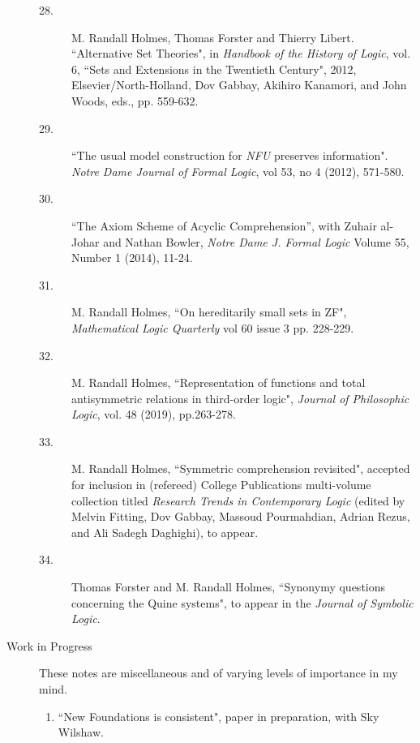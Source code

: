 \begin{description}
\begin{description}
\item[28.]
M. Randall Holmes, Thomas Forster and Thierry Libert. ``Alternative Set Theories",  in {\em Handbook of the History of Logic\/}, vol. 6, ``Sets and Extensions in the Twentieth Century", 2012, Elsevier/North-Holland, Dov Gabbay, Akihiro Kanamori, and John Woods, eds., pp. 559-632.

\item[29.] ``The usual model construction for {\em NFU\/} preserves information".  {\em Notre Dame Journal of Formal Logic\/}, vol 53, no 4 (2012), 571-580.

\item[30.]  ``The Axiom Scheme of Acyclic Comprehension'', with Zuhair al-Johar and Nathan Bowler, {\em Notre Dame J. Formal Logic\/}
Volume 55, Number 1 (2014), 11-24.

\item[31.]  M. Randall Holmes, ``On hereditarily small sets in ZF", {\em Mathematical Logic Quarterly\/}  vol 60 issue 3 pp. 228-229.

\item[32.]  M. Randall Holmes, ``Representation of functions and total antisymmetric relations in third-order logic", {\em Journal of Philosophic Logic\/}, vol. 48 (2019), pp.263-278.

\item[33.] M. Randall Holmes, ``Symmetric comprehension revisited", accepted for inclusion in (refereed) College Publications multi-volume collection titled {\em Research Trends in Contemporary Logic\/} (edited by Melvin Fitting, Dov Gabbay, Massoud Pourmahdian, Adrian Rezus, and Ali Sadegh Daghighi), to appear.

\item[34.]  Thomas Forster and M. Randall Holmes, ``Synonymy questions concerning the Quine systems", to appear in the {\em Journal of Symbolic Logic\/}.


        \end{description}

\newpage

\item[Work in Progress]

These notes are miscellaneous and of varying levels of importance in my mind.

\begin{enumerate}

\item ``New Foundations is consistent", paper in preparation, with Sky Wilshaw.


\end{enumerate}
\end{description}
